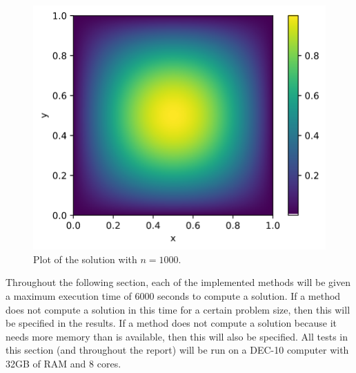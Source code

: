 \documentclass[11pt]{article}
\numberwithin{equation}{section}
\begin{document}
\begin{figure}[H]
\includegraphics[scale=.5]{img/solution2.png}
\centering
\caption{Plot of the solution with $n=1000$.}
\label{fig:solution}
\end{figure} 

Throughout the following section, each of the implemented methods will be given a maximum execution time of 6000 seconds to compute a solution. If a method does not compute a solution in this time for a certain problem size, then this will be specified in the results. If a method does not compute a solution because it needs more memory than is available, then this will also be specified. All tests in this section (and throughout the report) will be run on a DEC-10 computer with 32GB of RAM and 8 cores. 
\end{document}
